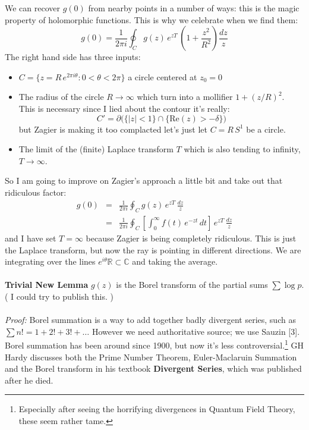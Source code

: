 \documentclass[12pt]{article}
\begin{document}
\newpage

\noindent We can recover $g(0)$ from nearby points in a number of ways: this is the magic property of holomorphic functions.  This is why we celebrate when we find them:
$$ g(0) = \frac{1}{2\pi i } \oint_C g(z) \, e^{zT} \, \left( 1 + \frac{z^2 }{R^2}\right)  \frac{dz}{z}$$
The right hand side has three inputs:
\begin{itemize}
\item $C = \{  z = R \, e^{2\pi i \theta}: 0 < \theta < 2\pi \}$ a circle centered at $z_0 = 0$
\item The radius of the circle $R \to \infty$ which turn into a mollifier $1 + (z/R)^2$. \\
This is necessary since I lied about the contour it's really: 
$$C'= \partial \Big( \{ |z| < 1\} \cap \{ \mathrm{Re}(z) > -\delta \} \Big) $$
but Zagier is making it too complacted let's just let $C = R \, S^1$ be a circle.
\item The limit of the (finite) Laplace transform $T$ which is also tending to infinity, $T \to \infty$.
\end{itemize}
So I am going to improve on Zagier's approach a little bit and take out that ridiculous factor:
\begin{eqnarray*} g(0) &=& \frac{1}{2\pi i } \oint_C g(z) \, e^{zT} \, \frac{dz}{z} \\ 
&=& 
\frac{1}{2\pi i } \oint_C \left[ \int_0^\infty f(t)\, e^{-zt} \, dt 
\right]  \, e^{zT} \, \frac{dz}{z}
\end{eqnarray*}
and I have set $T = \infty$ because Zagier is being completely ridiculous.  This is just the Laplace transform, but now the ray is pointing in different directions.  We are integrating over the lines $ e^{i\theta} \mathbb{R} \subset \mathbb{C} $ and taking the average. \\ \\
\textbf{Trivial New Lemma}  $g(z)$ is the Borel transform of the partial sums $\sum \log p$. ( I could try to publish this. ) \\ \\
\textit{Proof:} Borel summation is a way to add together badly divergent series, such as $\sum n! = 1 + 2! + 3! + \dots $ However we need authoritative source; we use Sauzin [3].  Borel summation has been around since 1900, but now it's less controversial.\footnote{Especially after seeing the horrifying divergences in Quantum Field Theory, these seem rather tame.} GH Hardy discusses both the Prime Number Theorem, Euler-Maclaruin Summation and the Borel transform in his textbook \textbf{Divergent Series}, which was published after he died.
\vfill
\end{document}
